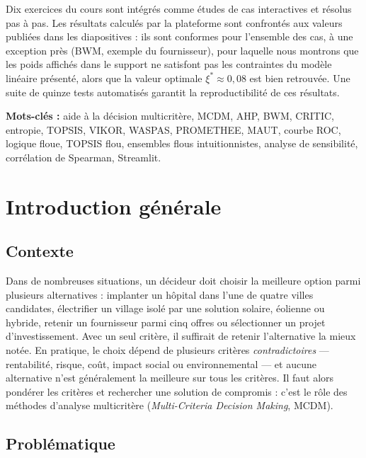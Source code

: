 \documentclass[11pt,a4paper]{report}
\theoremstyle{definition}
\theoremstyle{remark}
\begin{document}
Dix exercices du cours sont intégrés comme études de cas interactives et résolus pas à pas. Les résultats
calculés par la plateforme sont confrontés aux valeurs publiées dans les diapositives : ils sont conformes
pour l'ensemble des cas, à une exception près (BWM, exemple du fournisseur), pour laquelle nous montrons que
les poids affichés dans le support ne satisfont pas les contraintes du modèle linéaire présenté, alors que
la valeur optimale $\xi^*\approx 0{,}08$ est bien retrouvée. Une suite de quinze tests automatisés garantit
la reproductibilité de ces résultats.

\medskip
\noindent\textbf{Mots-clés :} aide à la décision multicritère, MCDM, AHP, BWM, CRITIC, entropie, TOPSIS,
VIKOR, WASPAS, PROMETHEE, MAUT, courbe ROC, logique floue, TOPSIS flou, ensembles flous intuitionnistes,
analyse de sensibilité, corrélation de Spearman, Streamlit.

\tableofcontents
\listoftables
\listoffigures

\clearpage
{}

\chapter{Introduction générale}

\section{Contexte}

Dans de nombreuses situations, un décideur doit choisir la meilleure option parmi plusieurs alternatives :
implanter un hôpital dans l'une de quatre villes candidates, électrifier un village isolé par une solution
solaire, éolienne ou hybride, retenir un fournisseur parmi cinq offres ou sélectionner un projet
d'investissement. Avec un seul critère, il suffirait de retenir l'alternative la mieux notée. En pratique,
le choix dépend de plusieurs critères \emph{contradictoires} --- rentabilité, risque, coût, impact social
ou environnemental --- et aucune alternative n'est généralement la meilleure sur tous les critères. Il faut
alors pondérer les critères et rechercher une solution de compromis : c'est le rôle des méthodes d'analyse
multicritère (\emph{Multi-Criteria Decision Making}, MCDM).

\section{Problématique}
\end{document}
